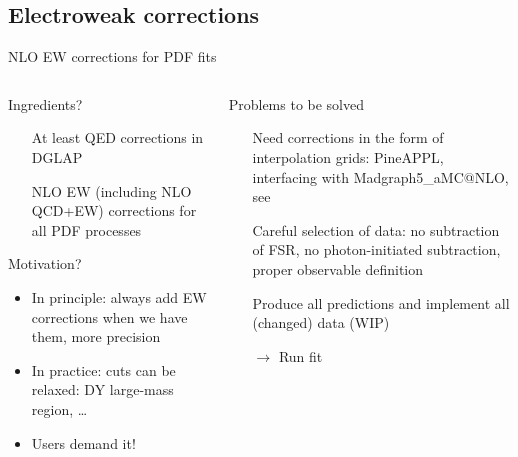 \author[Christopher Schwan]{}

\subsection{Electroweak corrections}

\begin{frame}{NLO EW corrections for PDF fits}
\fontsize{9}{11}\selectfont
\begin{columns}[onlytextwidth]
\begin{column}{0.45\textwidth}

\begin{block}{Ingredients?}
\begin{itemize}
\item[\ding{51}] At least QED corrections in DGLAP
\item[\ding{55}] NLO EW (including NLO QCD+EW) corrections for all PDF processes
\end{itemize}
\end{block}

\vspace*{0.5cm}

\begin{block}{Motivation?}
\begin{itemize}
\item In principle: always add EW corrections when we have them, more precision
\item In practice: cuts can be relaxed: DY large-mass region, \ldots
\item Users demand it!
\end{itemize}
\end{block}
\end{column}
\begin{column}{0.45\textwidth}
\begin{block}{Problems to be solved}
\begin{itemize}
\item[\ding{51}] Need corrections in the form of \alert{interpolation grids}: PineAPPL, interfacing with Madgraph5\_aMC@NLO, see\\
\item[\ding{51}] Careful selection of data: no subtraction of FSR, no photon-initiated subtraction, proper observable definition
\item[\ding{55}] Produce all predictions and implement all (changed) data (WIP)
\item[$\rightarrow$] Run fit
\end{itemize}
\end{block}
\end{column}
\end{columns}
\end{frame}

